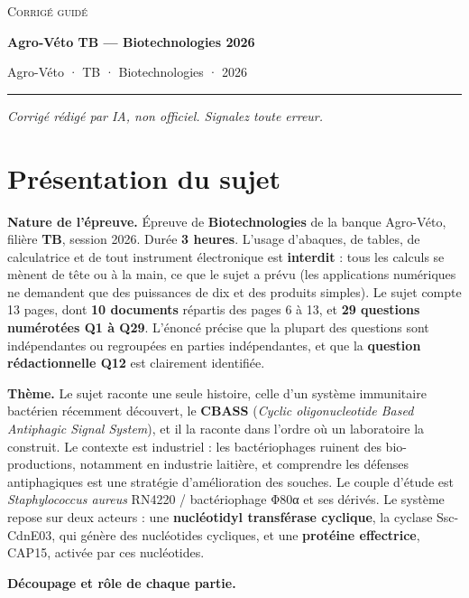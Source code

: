 \documentclass[11pt,a4paper]{article}
\begin{document}
\thispagestyle{plain}
\begin{center}
  {\small\scshape Corrigé guidé}\par\smallskip
  {\LARGE\bfseries Agro-Véto TB — Biotechnologies 2026\par}\medskip
  {\large Agro-Véto · TB · Biotechnologies · 2026\par}
\end{center}
\vspace{2pt}\hrule\vspace{8pt}

\emph{Corrigé rédigé par IA, non officiel. Signalez toute erreur.}

\hypertarget{pruxe9sentation-du-sujet}{%
\section{Présentation du sujet}\label{pruxe9sentation-du-sujet}}

\textbf{Nature de l'épreuve.} Épreuve de \textbf{Biotechnologies} de la banque Agro-Véto, filière \textbf{TB}, session 2026. Durée \textbf{3 heures}. L'usage d'abaques, de tables, de calculatrice et de tout instrument électronique est \textbf{interdit} : tous les calculs se mènent de tête ou à la main, ce que le sujet a prévu (les applications numériques ne demandent que des puissances de dix et des produits simples). Le sujet compte 13 pages, dont \textbf{10 documents} répartis des pages 6 à 13, et \textbf{29 questions numérotées Q1 à Q29}. L'énoncé précise que la plupart des questions sont indépendantes ou regroupées en parties indépendantes, et que la \textbf{question rédactionnelle Q12} est clairement identifiée.

\textbf{Thème.} Le sujet raconte une seule histoire, celle d'un système immunitaire bactérien récemment découvert, le \textbf{CBASS} (\emph{Cyclic oligonucleotide Based Antiphagic Signal System}), et il la raconte dans l'ordre où un laboratoire la construit. Le contexte est industriel : les bactériophages ruinent des bio-productions, notamment en industrie laitière, et comprendre les défenses antiphagiques est une stratégie d'amélioration des souches. Le couple d'étude est \emph{Staphylococcus aureus} RN4220 / bactériophage Φ80α et ses dérivés. Le système repose sur deux acteurs : une \textbf{nucléotidyl transférase cyclique}, la cyclase Ssc-CdnE03, qui génère des nucléotides cycliques, et une \textbf{protéine effectrice}, CAP15, activée par ces nucléotides.

\textbf{Découpage et rôle de chaque partie.}
\end{document}
